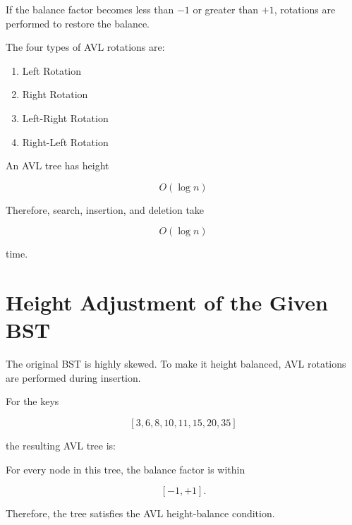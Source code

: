 \documentclass[12pt,a4paper]{article}
\begin{document}
If the balance factor becomes less than $-1$ or greater than $+1$, rotations are performed to restore the balance.

The four types of AVL rotations are:

\begin{enumerate}
    \item Left Rotation
    \item Right Rotation
    \item Left-Right Rotation
    \item Right-Left Rotation
\end{enumerate}

An AVL tree has height

\[
O(\log n)
\]

Therefore, search, insertion, and deletion take

\[
O(\log n)
\]

time.

\section{Height Adjustment of the Given BST}

The original BST is highly skewed. To make it height balanced, AVL rotations are performed during insertion.

For the keys

\[
[3,6,8,10,11,15,20,35]
\]

the resulting AVL tree is:

\begin{center}
\end{center}

For every node in this tree, the balance factor is within

\[
[-1,+1].
\]

Therefore, the tree satisfies the AVL height-balance condition.
\end{document}
